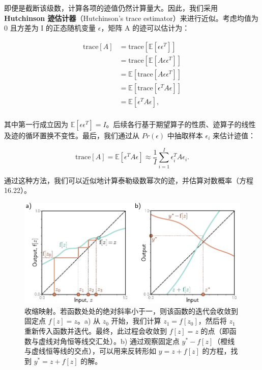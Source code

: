 \documentclass[lang=cn,newtx,10pt,scheme=chinese]{elegantbook}
\begin{document}
即便是截断该级数，计算各项的迹值仍然计算量大。因此，我们采用 \textbf{Hutchinson 迹估计器}（Hutchinson's trace estimator）来进行近似。考虑均值为 0 且方差为 I 的正态随机变量 \(\epsilon\)，矩阵 A 的迹可以估计为：

\begin{equation}
\begin{aligned}
\text{trace}[A] &= \text{trace} [\mathbb{E} [\epsilon \epsilon^T]]  \\
&= \text{trace} [\mathbb{E} [A \epsilon \epsilon^T]]  \\
&= \mathbb{E} [\text{trace} [A \epsilon \epsilon^T]]  \\
&= \mathbb{E} [\text{trace} [\epsilon^T A \epsilon]] \\
&= \mathbb{E} [\epsilon^T A \epsilon], \\
\end{aligned} 
\end{equation}

其中第一行成立因为 \(\mathbb{E}[\epsilon \epsilon^T] = I\)。后续各行基于期望算子的性质、迹算子的线性及迹的循环置换不变性。最后，我们通过从 \(Pr(\epsilon)\) 中抽取样本 \(\epsilon_i\) 来估计迹值：

\begin{equation}
\text{trace}[A] = \mathbb{E} [\epsilon^T A \epsilon] \approx \frac{1}{I} \sum_{i=1}^I \epsilon_i^T A \epsilon_i. 
\end{equation}

通过这种方法，我们可以近似地计算泰勒级数幂次的迹，并估算对数概率（方程 16.22）。

\begin{figure}[ht!]
\centering
\includegraphics[width=0.7\linewidth]{PDFFigures/UDLChap16PDF/FlowBanach.pdf}
\caption{收缩映射。若函数处处的绝对斜率小于一，则该函数的迭代会收敛到固定点 \( f[z] = z \)。a) 从 \( z_0 \) 开始，我们计算 \( z_1 = f[z_0] \)，然后将 \( z_1 \) 重新传入函数并迭代。最终，此过程会收敛到 \( f[z] = z \) 的点（即函数与虚线对角恒等线交汇处）。b) 通过观察固定点 \( y^* - f[z] \)（橙线与虚线恒等线的交点），可以用来反转形如 \( y = z + f[z] \) 的方程，找到 \( y^* = z + f[z] \) 的解。}
\end{figure}
\end{document}
